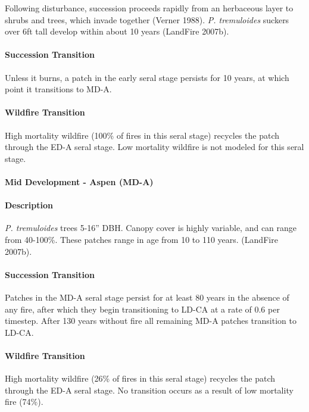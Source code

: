 Following disturbance, succession proceeds rapidly from an herbaceous layer to shrubs and trees, which invade together (Verner 1988). \emph{P. tremuloides} suckers over 6ft tall develop within about 10 years (LandFire 2007b). 

\paragraph*{Succession Transition} Unless it burns, a patch in the early seral stage persists for 10 years, at which point it transitions to MD-A.

\paragraph*{Wildfire Transition} High mortality wildfire (100\% of fires in this seral stage) recycles the patch through the ED-A seral stage. Low mortality wildfire is not modeled for this seral stage.

\noindent\hrulefill


\paragraph*{Mid Development - Aspen (MD-A)}

\paragraph*{Description} \emph{P. tremuloides} trees 5-16'' DBH. Canopy cover is highly variable, and can range from 40-100\%. These patches range in age from 10 to 110 years. (LandFire 2007b).

\paragraph*{Succession Transition} Patches in the MD-A seral stage persist for at least 80 years in the absence of any fire, after which they begin transitioning to LD-CA at a rate of 0.6 per timestep. After 130 years without fire all remaining MD-A patches transition to LD-CA. 

\paragraph*{Wildfire Transition} High mortality wildfire (26\% of fires in this seral stage) recycles the patch through the ED-A seral stage. No transition occurs as a result of low mortality fire (74\%).

